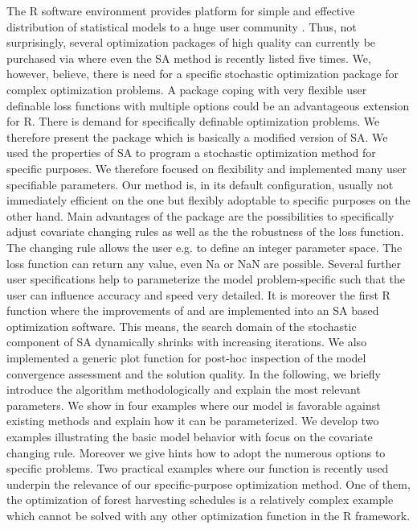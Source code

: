 The R software environment provides platform for simple and effective distribution of statistical models to a huge user community \citep{xiang_2013}. Thus, not surprisingly, several optimization packages of high quality can currently be purchased via  \citep{theussl_2016} where even the SA method is recently listed five times. We, however, believe, there is need for a specific stochastic optimization package for complex optimization problems. A package coping with very flexible user definable loss functions with multiple options could be an advantageous extension for R. There is demand for specifically definable optimization problems. We therefore present the package  which is basically a modified version of SA. We used the properties of SA to program a stochastic optimization method for specific purposes. We therefore focused on flexibility and implemented many user specifiable parameters. Our method is, in its default configuration, usually not immediately efficient on the one but flexibly adoptable to specific purposes on the other hand. Main advantages of the package are the possibilities to specifically adjust covariate changing rules as well as the the robustness of the loss function. The changing rule allows the user e.g. to define an integer parameter space. The loss function can return any value, even Na or NaN are possible. Several further user specifications help to parameterize the model problem-specific such that the user can influence accuracy and speed very detailed. It is moreover the first R function where the improvements of \citet{corana_1987} and \citet{pronzato_1984} are implemented into an SA based optimization software. This means, the search domain of the stochastic component of SA dynamically shrinks with increasing iterations. We also implemented a generic plot function for post-hoc inspection of the model convergence assessment and the solution quality. In the following, we briefly introduce the algorithm methodologically and explain the most relevant parameters. We show in four examples where our model is favorable against existing methods and explain how it can be parameterized. We develop two examples illustrating the basic model behavior with focus on the covariate changing rule. Moreover we give hints how to adopt the numerous options to specific problems. Two practical examples where our function is recently used underpin the relevance of our specific-purpose optimization method. One of them, the optimization of forest harvesting schedules is a relatively complex example which cannot be solved with any other optimization function in the R framework.

